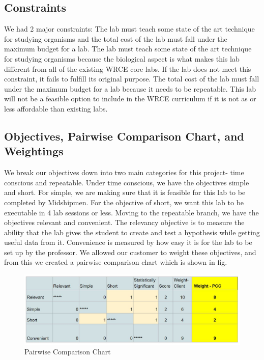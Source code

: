 \documentclass{article}
\begin{document}
\subsection{Constraints}
\par We had 2 major constraints: The lab must teach some state of the art technique for studying organisms and the total cost of the lab must fall under the maximum budget for a lab. The lab must teach some state of the art technique for studying organisms because the biological aspect is what makes this lab different from all of the existing WRCE core labs. If the lab does not meet this constraint, it fails to fulfill its original purpose. The total cost of the lab must fall under the maximum budget for a lab because it needs to be repeatable. This lab will not be a feasible option to include in the WRCE curriculum if it is not as or less affordable than existing labs.

\subsection{Objectives, Pairwise Comparison Chart, and Weightings}
\par We break our objectives down into two main categories for this project- time conscious and repeatable. Under time conscious, we have the objectives simple and short. For simple, we are making sure that it is feasible for this lab to be completed by Midshipmen. For the objective of short, we want this lab to be executable in 4 lab sessions or less. Moving to the repeatable branch, we have the objectives relevant and convenient. The relevancy objective is to measure the ability that the lab gives the student to create and test a hypothesis while getting useful data from it. Convenience is measured by how easy it is for the lab to be set up by the professor. We allowed our customer to weight these objectives, and from this we created a pairwise comparison chart which is shown in {fig}. 

\begin{figure}[ht!]
\centering
\includegraphics[scale=0.65]{PCC.JPG}
\caption{Pairwise Comparison Chart}
\label{fig:lab}
\end{figure}
\end{document}
